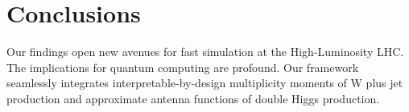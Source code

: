 \section{Conclusions}\label{sec:conclusions}

Our findings open new avenues for fast simulation at the High-Luminosity
LHC. The implications for quantum computing are profound. Our framework
seamlessly integrates interpretable-by-design multiplicity moments of W
plus jet production and approximate antenna functions of double Higgs
production.

